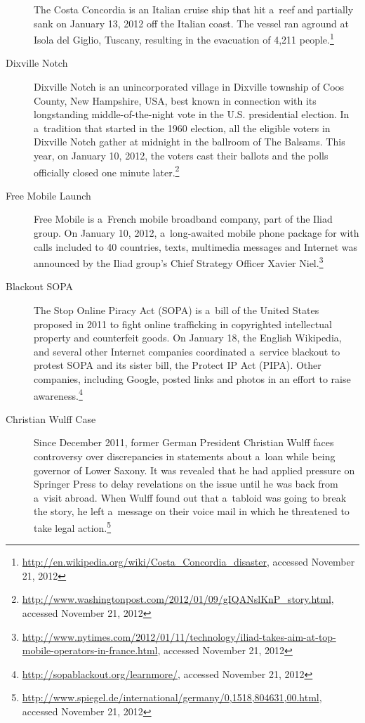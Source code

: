 \begin{description}
       The Costa Concordia is an Italian cruise ship that hit
       a~reef and partially sank on January 13, 2012 off the
       Italian coast. The vessel ran aground at Isola del Giglio,
       Tuscany, resulting in the evacuation of 4,211
       people.\footnote{\url{http://en.wikipedia.org/wiki/Costa_Concordia_disaster},
       accessed November 21, 2012}
  \item[Dixville Notch]
       Dixville Notch is an unincorporated village in Dixville
       township of Coos County, New Hampshire, USA, best known in
       connection with its longstanding middle-of-the-night vote in
       the U.S. presidential election. In a~tradition that started
       in the 1960 election, all the eligible voters in Dixville
       Notch gather at midnight in the ballroom of The Balsams.
       This year, on January 10, 2012, the voters cast their
       ballots and the polls officially closed one minute
       later.\footnote{\url{http://www.washingtonpost.com/2012/01/09/gIQANslKnP_story.html},
       accessed November 21, 2012}
  \item[Free Mobile Launch]
       Free Mobile is a~French mobile broadband company, part of
       the Iliad group. On January 10, 2012, a~long-awaited mobile
       phone package for  with calls included to 40
       countries, texts, multimedia messages and Internet was
       announced by the Iliad group's Chief Strategy Officer
       Xavier
       Niel.\footnote{\url{http://www.nytimes.com/2012/01/11/technology/iliad-takes-aim-at-top-mobile-operators-in-france.html},
       accessed November 21, 2012}
  \item[Blackout SOPA]
       The Stop Online Piracy Act (SOPA) is a~bill of the United
       States proposed in 2011 to fight online trafficking in
       copyrighted intellectual property and counterfeit goods.
       On January 18, the English Wikipedia, and several
       other Internet companies coordinated a~service blackout
       to protest SOPA and its sister bill, the Protect IP Act
       (PIPA).
       Other companies, including Google, posted links and
       photos in an effort to raise
       awareness.\footnote{\url{http://sopablackout.org/learnmore/},
       accessed November 21, 2012}
  \item[Christian Wulff Case]
       Since December 2011, former German President Christian
       Wulff faces controversy over discrepancies in statements
       about a~loan while being governor of Lower Saxony.
       It was revealed that he had applied pressure
       on Springer Press to delay revelations on the issue until
       he was back from a~visit abroad. When Wulff found out that
       a~tabloid was going to break the story, he left a~message
       on their voice mail in which he threatened to take legal
       action.\footnote{\url{http://www.spiegel.de/international/germany/0,1518,804631,00.html},
       accessed November 21, 2012}
\end{description}

